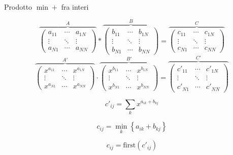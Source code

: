 \documentclass{beamer}
\theoremstyle{plain}
\theoremstyle{definition}
\theoremstyle{remark}
\newcommand{\set}[1]{\left\{#1\right\}}
\newcommand{\pa}[1]{\left(#1\right)}
\begin{document}
\begin{frame}{Prodotto $\min + $ fra interi}
\label{frame:prodottointeri}
  \begin{overprint}
    \begin{equation*}
      \overbrace{
        \begin{pmatrix}
          a_{11}  & \cdots & a_{1N} \\
          \vdots & \ddots & \vdots \\
          a_{N1} & \cdots & a_{NN} 
        \end{pmatrix}} ^{A} *
      \overbrace{
        \begin{pmatrix}
          b_{11}  & \cdots & b_{1N} \\
          \vdots & \ddots & \vdots \\
          b_{N1} & \cdots & b_{NN} 
        \end{pmatrix}} ^{B} =
      \overbrace{
        \begin{pmatrix}
          c_{11}  & \cdots & c_{1N} \\
          \vdots & \ddots & \vdots \\
          c_{N1} & \cdots & c_{NN} 
        \end{pmatrix}} ^{C}
    \end{equation*}
    \begin{equation*}
      \overbrace{
        \begin{pmatrix}
          x^{a_{11}}  & \cdots & x^{a_{1N}} \\
          \vdots & \ddots & \vdots \\
          x^{a_{N1}} & \cdots & x^{a_{NN}} 
        \end{pmatrix}} ^{A'} \cdot
      \overbrace{
        \begin{pmatrix}
          x^{b_{11}}  & \cdots & x^{b_{1N}} \\
          \vdots & \ddots & \vdots \\
          x^{b_{N1}} & \cdots & x^{b_{NN}} 
        \end{pmatrix}} ^{B'} =
      \overbrace{
      \begin{pmatrix}
        c'_{11}  & \cdots & c'_{1N} \\
        \vdots & \ddots & \vdots \\
        c'_{N1} & \cdots & c'_{NN} 
      \end{pmatrix}}^{C'}
    \end{equation*}
  \end{overprint}
  \begin{overprint}
     \[ c'_{ij} = \sum _k x^{a_{ik} + b_{kj}} \]
  \end{overprint}
  \[ c_{ij} = \min _k \set{ a_{ik} + b_{kj} } \]
  \begin{overprint}
     \[ c_{ij} = \mathrm{first}\pa{c'_{ij}} \]
  \end{overprint}
\end{frame}
\end{document}
